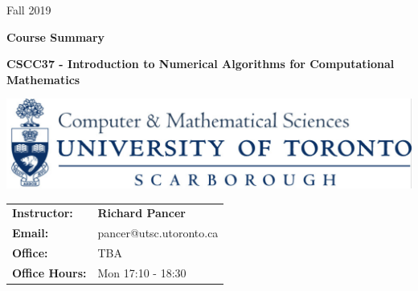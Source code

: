 \documentclass{article}
\begin{document}
\begin{titlepage}
\begin{center}
  \vspace{5cm}



  
    
    
    {Fall 2019}

  \hrulefill
  
  \huge{\textbf{Course Summary}}\\
 
  \vspace{0.3cm}

  \textbf{\LARGE CSCC37 - Introduction to Numerical Algorithms for Computational Mathematics}

  \hrulefill

  \vspace{0.5cm}    

  

    \vspace{1cm}

 \includegraphics[trim={0 0 0.1cm 0},clip, scale = 0.1]{CSM}

  \vspace{4cm}
    

  \end{center}

    
  \begin{center}
  
  \vspace{4cm}
  
  \vspace{1cm}

  \begin{tabular}{ll}
      \textbf{Instructor:} & \textbf{Richard Pancer}\\
  \textbf{Email:} & pancer@utsc.utoronto.ca\\
  \textbf{Office:} & TBA\\
  \textbf{Office Hours:}& Mon 17:10 - 18:30\\
  \end{tabular}



  \end{center}


\end{titlepage}
\pagestyle{fancy}
\end{document}
